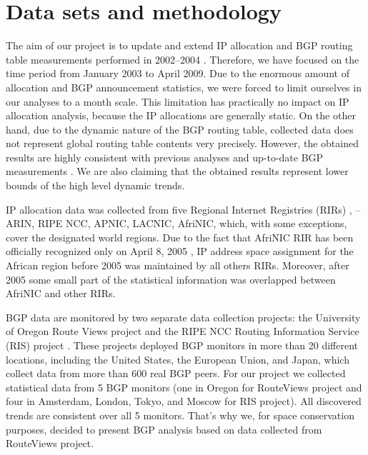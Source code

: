 \section{Data sets and methodology}
\label{sec:data sets}

The aim of our project is to update and extend IP allocation and BGP routing
table measurements performed in 2002--2004
\cite{Meng:2003:An-analysis-of-BGP-routing} \cite{Xu:2003:IPv4-Address}
\cite{Meng:2005:IPv4-address}. Therefore, we have focused on the time period
from January 2003 to April 2009. Due to the enormous amount of allocation and
BGP announcement statistics, we were forced to limit ourselves in our analyses
to a month scale. This limitation has practically no impact on IP allocation
analysis, because the IP allocations are generally static. On the other hand,
due to the dynamic nature of the BGP routing table, collected data does not
represent global routing table contents very precisely. However, the obtained
results are highly consistent with previous analyses
\cite{Meng:2005:IPv4-address} and up-to-date BGP measurements
\cite{::IPv4-Address-Report}. We are also claiming that the obtained results
represent lower bounds of the high level dynamic trends.


IP allocation data was collected from five Regional Internet Registries (RIRs)
\cite{::IANA----Number}, -- ARIN, RIPE NCC, APNIC, LACNIC, AfriNIC, which,
with some exceptions, cover the designated world regions. Due to the fact that
AfriNIC RIR has been officially recognized only on April 8, 2005
\cite{AKPLOGAN:2005:AfriNIC-now-officially}, IP address space assignment for
the African region before 2005 was maintained by all others RIRs. Moreover,
after 2005 some small part of the statistical information was overlapped
between AfriNIC and other RIRs.

BGP data are monitored by two separate data collection projects: the
University of Oregon Route Views project \cite{::Route-Views} and the RIPE NCC
Routing Information Service (RIS) project \cite{::RIS}. These projects
deployed BGP monitors in more than 20 different locations, including the
United States, the European Union, and Japan, which collect data from more
than 600 real BGP peers. For our project we collected statistical data from 5
BGP monitors (one in Oregon for RouteViews project and four in Amsterdam,
London, Tokyo, and Moscow for RIS project). All discovered trends are
consistent over all 5 monitors. That's why we, for space conservation
purposes, decided to present BGP analysis based on data collected from
RouteViews project.


